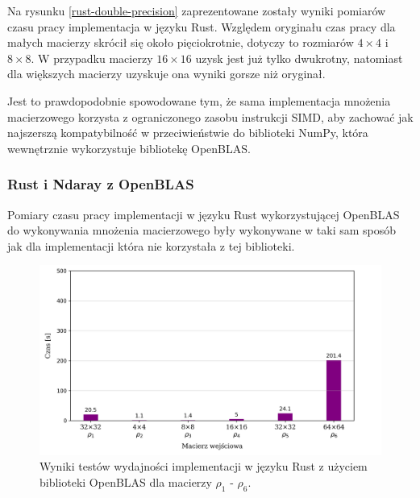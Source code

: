 \documentclass[11pt, a4paper]{article}
\begin{document}
\begin{sloppypar}
    Na rysunku \ref{rust-double-precision} zaprezentowane zostały wyniki pomiarów czasu pracy
    implementacja w języku Rust. Względem oryginału czas pracy dla małych macierzy
    skrócił się około pięciokrotnie, dotyczy to rozmiarów $4\times4$ i $8\times8$. W
    przypadku macierzy $16\times16$ uzysk jest już tylko dwukrotny, natomiast dla większych
    macierzy uzyskuje ona wyniki gorsze niż oryginał.

    Jest to prawdopodobnie spowodowane tym, że sama implementacja mnożenia macierzowego
    korzysta z ograniczonego zasobu instrukcji SIMD, aby zachować jak najszerszą kompatybilność
    w przeciwieństwie do biblioteki NumPy, która wewnętrznie wykorzystuje bibliotekę
    OpenBLAS\cite{NumPy_Doc}.

    \FloatBarrier

    \subsubsection{ Rust i Ndaray z OpenBLAS }
    Pomiary czasu pracy implementacji w języku Rust wykorzystującej OpenBLAS do
    wykonywania mnożenia macierzowego były wykonywane w taki sam sposób jak dla
    implementacji która nie korzystała z tej biblioteki.

    \begin{figure}[ht]
      \centering
      \includegraphics[width=1.0\textwidth]{"resources/rust_blas_perf_tests.png"}
      \caption{Wyniki testów wydajności implementacji w języku Rust z użyciem biblioteki OpenBLAS dla macierzy $\rho
      _{1}$ - $\rho_{6}$.}
      \label{rust-openblas-double-precision}
    \end{figure}


\end{sloppypar}
\end{document}
